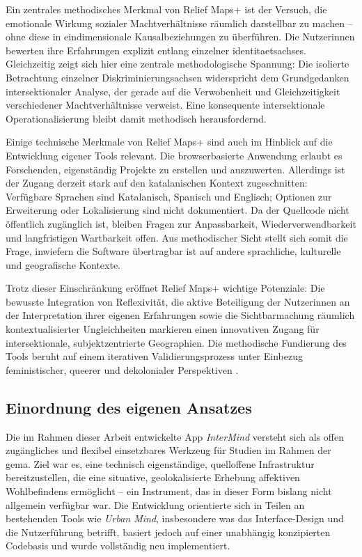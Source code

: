 Ein zentrales methodisches Merkmal von Relief Maps+ ist der Versuch, die emotionale Wirkung sozialer Machtverhältnisse räumlich darstellbar zu machen – ohne diese in eindimensionale Kausalbeziehungen zu überführen. Die Nutzer\genderstern innen bewerten ihre Erfahrungen explizit entlang einzelner \glspl{identitaetsachse}. Gleichzeitig zeigt sich hier eine zentrale methodologische Spannung: Die isolierte Betrachtung einzelner Diskriminierungsachsen widerspricht dem Grundgedanken intersektionaler Analyse, der gerade auf die Verwobenheit und Gleichzeitigkeit verschiedener Machtverhältnisse verweist. Eine konsequente intersektionale Operationalisierung bleibt damit methodisch herausfordernd.

Einige technische Merkmale von Relief Maps+ sind auch im Hinblick auf die Entwicklung eigener Tools relevant. Die browserbasierte Anwendung erlaubt es Forschenden, eigenständig Projekte zu erstellen und auszuwerten. Allerdings ist der Zugang derzeit stark auf den katalanischen Kontext zugeschnitten: Verfügbare Sprachen sind Katalanisch, Spanisch und Englisch; Optionen zur Erweiterung oder Lokalisierung sind nicht dokumentiert. Da der Quellcode nicht öffentlich zugänglich ist, bleiben Fragen zur Anpassbarkeit, Wiederverwendbarkeit und langfristigen Wartbarkeit offen. Aus methodischer Sicht stellt sich somit die Frage, inwiefern die Software übertragbar ist auf andere sprachliche, kulturelle und geografische Kontexte.

Trotz dieser Einschränkung eröffnet Relief Maps+ wichtige Potenziale: Die bewusste Integration von Reflexivität, die aktive Beteiligung der Nutzer\genderstern innen an der Interpretation ihrer eigenen Erfahrungen sowie die Sichtbarmachung räumlich kontextualisierter Ungleichheiten markieren einen innovativen Zugang für intersektionale, subjektzentrierte Geographien. Die methodische Fundierung des Tools beruht auf einem iterativen Validierungsprozess unter Einbezug feministischer, queerer und dekolonialer Perspektiven \parencite{luizdesouzaSpiralValidationProcess2025}.



\subsection{Einordnung des eigenen Ansatzes}

Die im Rahmen dieser Arbeit entwickelte App \textit{InterMind} versteht sich als offen zugängliches und flexibel einsetzbares Werkzeug für Studien im Rahmen der \acrshort{gema}. Ziel war es, eine technisch eigenständige, quelloffene Infrastruktur bereitzustellen, die eine situative, geolokalisierte Erhebung affektiven Wohlbefindens ermöglicht – ein Instrument, das in dieser Form bislang nicht allgemein verfügbar war. Die Entwicklung orientierte sich in Teilen an bestehenden Tools wie \textit{Urban Mind}, insbesondere was das Interface-Design und die Nutzerführung betrifft, basiert jedoch auf einer unabhängig konzipierten Codebasis und wurde vollständig neu implementiert.

